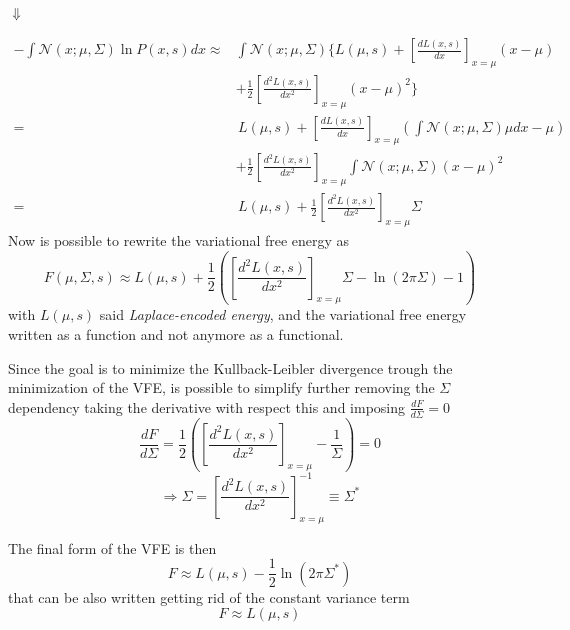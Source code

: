 \documentclass[a4paper, 10pt]{article}
\begin{document}
\begin{center}
$\Downarrow$
\end{center}
\begin{equation}
\begin{split}
- \int \mathcal{N}(x;\mu,\Sigma) \ln P(x,s) d x \approx & \int \mathcal{N}(x;\mu,\Sigma) \Big\lbrace L(\mu,s) + \left[ \frac{dL(x,s)}{dx} \right]_{x=\mu} (x-\mu) \\
													  & + \frac{1}{2} \left[ \frac{d^2L(x,s)}{dx^2} \right]_{x=\mu} (x-\mu)^2 \Big\rbrace \\
											  		= & \, L(\mu,s) + \left[ \frac{dL(x,s)}{dx} \right]_{x=\mu} \left( \int \mathcal{N}(x;\mu,\Sigma) \mu dx - \mu \right) \\
											  		& + \frac{1}{2} \left[ \frac{d^2L(x,s)}{dx^2} \right]_{x=\mu} \int \mathcal{N}(x;\mu,\Sigma) (x-\mu)^2 \\
											  		= & \, L(\mu,s) + \frac{1}{2} \left[ \frac{d^2L(x,s)}{dx^2} \right]_{x=\mu} \Sigma
\end{split}
\end{equation}
Now is possible to rewrite the variational free energy as
\begin{equation}
F(\mu, \Sigma, s) \approx L(\mu, s) + \frac{1}{2}\left( \left[ \frac{d^2L(x,s)}{dx^2} \right]_{x=\mu} \Sigma - \ln (2 \pi \Sigma) -1 \right)
\end{equation}
with $L(\mu, s)$ said \emph{Laplace-encoded energy}, and the variational free energy written as a function and not anymore as a functional.

Since the goal is to minimize the Kullback-Leibler divergence trough the minimization of the VFE, is possible to simplify further removing the $\Sigma$ dependency taking the derivative with respect this and imposing $\frac{dF}{d\Sigma}=0$
\begin{equation}
\frac{dF}{d\Sigma}= \frac{1}{2} \left( \left[ \frac{d^2L(x,s)}{dx^2} \right]_{x=\mu} - \frac{1}{\Sigma} \right) = 0
\end{equation}
\begin{equation}
\Rightarrow \Sigma = \left[ \frac{d^2L(x,s)}{dx^2} \right]_{x=\mu}^{-1} \equiv \Sigma^{\ast}
\end{equation}

The final form of the VFE is then
\begin{equation}
F \approx L(\mu,s) - \frac{1}{2} \ln \left( 2 \pi \Sigma^{\ast} \right)
\end{equation}
that can be also written getting rid of the constant variance term
\begin{equation}
F \approx L(\mu,s)
\end{equation}
\end{document}
